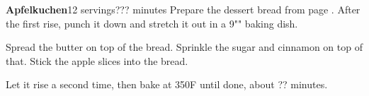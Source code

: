 \documentclass[../Cookbook.tex]{subfiles}
\begin{document}
\begin{recipe}[Apfelkuchen]{\textbf{Apfelkuchen}}{12 servings}{??? minutes}
	Prepare the dessert bread from page \pageref{BaseDessertBread}.
	After the first rise, punch it down and stretch it out in a 9"" baking dish.
	
	Spread the butter on top of the bread.
	Sprinkle the sugar and cinnamon on top of that.
	Stick the apple slices into the bread.
	
	Let it rise a second time, then bake at 350\0F until done, about ?? minutes.
\end{recipe}
\end{document}
